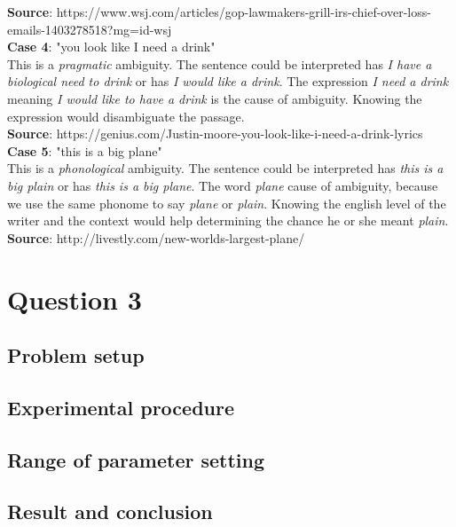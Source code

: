 \documentclass[12pt]{article}
\begin{document}
\textbf{Source}: https://www.wsj.com/articles/gop-lawmakers-grill-irs-chief-over-loss-emails-1403278518?mg=id-wsj\\

\textbf{Case 4}: "you look like I need a drink"\\

This is a \textit{pragmatic} ambiguity. The sentence could be interpreted has \textit{I have a biological need to drink} or has \textit{I would like a drink}. The expression \textit{I need a drink} meaning \textit{I would like to have a drink} is the cause of ambiguity. Knowing the expression would disambiguate the passage.\\

\textbf{Source}: https://genius.com/Justin-moore-you-look-like-i-need-a-drink-lyrics\\

\textbf{Case 5}: "this is a big plane"\\

This is a \textit{phonological} ambiguity. The sentence could be interpreted has \textit{this is a big plain} or has \textit{this is a big plane}. The word \textit{plane} cause of ambiguity, because we use the same phonome to say \textit{plane} or \textit{plain}. Knowing the english level of the writer and the context would help determining the chance he or she meant \textit{plain}. \\

\textbf{Source}: http://livestly.com/new-worlds-largest-plane/\\

\section*{Question 3}

\subsection*{Problem setup}

\subsection*{Experimental procedure}

\subsection*{Range of parameter setting}

\subsection*{Result and conclusion}
\end{document}
